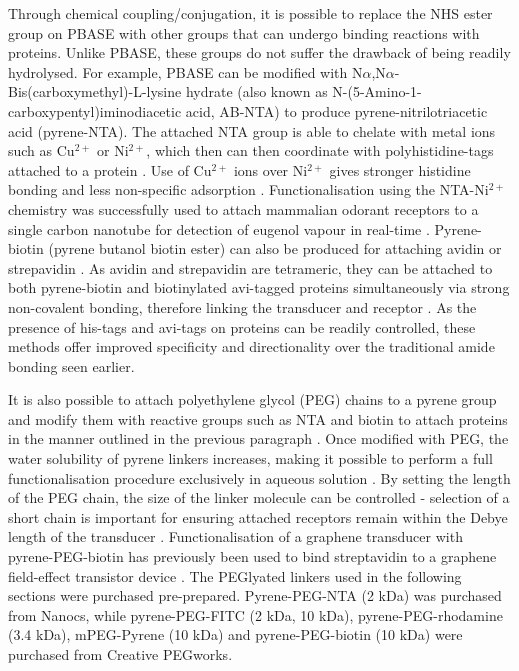 \documentclass[
  a4paper,
]{scrbook}
\begin{document}
Through chemical coupling/conjugation, it is possible to replace the NHS
ester group on PBASE with other groups that can undergo binding
reactions with proteins. Unlike PBASE, these groups do not suffer the
drawback of being readily hydrolysed. For example, PBASE can be modified
with N\(\alpha\),N\(\alpha\)-Bis(carboxymethyl)-L-lysine hydrate (also
known as N-(5-Amino-1-carboxypentyl)iminodiacetic acid, AB-NTA) to
produce pyrene-nitrilotriacetic acid (pyrene-NTA). The attached NTA
group is able to chelate with metal ions such as Cu\(^{2+}\) or
Ni\(^{2+}\), which then can then coordinate with polyhistidine-tags
attached to a protein \autocite{Holzinger2011,Amano2016,Chang2017}. Use
of Cu\(^{2+}\) ions over Ni\(^{2+}\) gives stronger histidine bonding
and less non-specific adsorption \autocite{Chang2017}. Functionalisation
using the NTA-Ni\(^{2+}\) chemistry was successfully used to attach
mammalian odorant receptors to a single carbon nanotube for detection of
eugenol vapour in real-time \autocite{Goldsmith2011}. Pyrene-biotin
(pyrene butanol biotin ester) can also be produced for attaching avidin
or strepavidin \autocite{Holzinger2011}. As avidin and strepavidin are
tetrameric, they can be attached to both pyrene-biotin and biotinylated
avi-tagged proteins simultaneously via strong non-covalent bonding,
therefore linking the transducer and receptor
\autocite{Star2003a,Dundas2013,Hermanson2013-11,Fairhead2015}. As the
presence of his-tags and avi-tags on proteins can be readily controlled,
these methods offer improved specificity and directionality over the
traditional amide bonding seen earlier.

It is also possible to attach polyethylene glycol (PEG) chains to a
pyrene group and modify them with reactive groups such as NTA and biotin
to attach proteins in the manner outlined in the previous paragraph
\autocite{Hermanson2013-18,Meran2018}. Once modified with PEG, the water
solubility of pyrene linkers increases, making it possible to perform a
full functionalisation procedure exclusively in aqueous solution
\autocite{Hermanson2013-18}. By setting the length of the PEG chain, the
size of the linker molecule can be controlled - selection of a short
chain is important for ensuring attached receptors remain within the
Debye length of the transducer \autocite{Shkodra2021}. Functionalisation
of a graphene transducer with pyrene-PEG-biotin has previously been used
to bind streptavidin to a graphene field-effect transistor device
\autocite{Miki2019}. The PEGlyated linkers used in the following
sections were purchased pre-prepared. Pyrene-PEG-NTA (2 kDa) was
purchased from Nanocs, while pyrene-PEG-FITC (2 kDa, 10 kDa),
pyrene-PEG-rhodamine (3.4 kDa), mPEG-Pyrene (10 kDa) and
pyrene-PEG-biotin (10 kDa) were purchased from Creative PEGworks.
\end{document}
